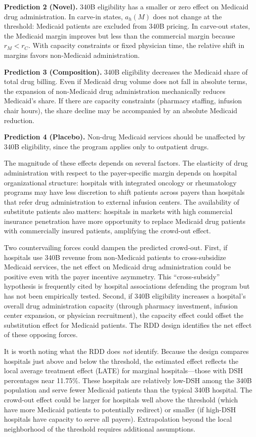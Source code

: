 \documentclass[12pt]{article}
\begin{document}
\textbf{Prediction 2 (Novel).} 340B eligibility has a smaller or zero effect on Medicaid drug administration. In carve-in states, $a_h(M)$ does not change at the threshold: Medicaid patients are excluded from 340B pricing. In carve-out states, the Medicaid margin improves but less than the commercial margin because $r_M < r_C$. With capacity constraints or fixed physician time, the relative shift in margins favors non-Medicaid administration.

\textbf{Prediction 3 (Composition).} 340B eligibility decreases the Medicaid share of total drug billing. Even if Medicaid drug volume does not fall in absolute terms, the expansion of non-Medicaid drug administration mechanically reduces Medicaid's share. If there are capacity constraints (pharmacy staffing, infusion chair hours), the share decline may be accompanied by an absolute Medicaid reduction.

\textbf{Prediction 4 (Placebo).} Non-drug Medicaid services should be unaffected by 340B eligibility, since the program applies only to outpatient drugs.

The magnitude of these effects depends on several factors. The elasticity of drug administration with respect to the payer-specific margin depends on hospital organizational structure: hospitals with integrated oncology or rheumatology programs may have less discretion to shift patients across payers than hospitals that refer drug administration to external infusion centers. The availability of substitute patients also matters: hospitals in markets with high commercial insurance penetration have more opportunity to replace Medicaid drug patients with commercially insured patients, amplifying the crowd-out effect.

Two countervailing forces could dampen the predicted crowd-out. First, if hospitals use 340B revenue from non-Medicaid patients to cross-subsidize Medicaid services, the net effect on Medicaid drug administration could be positive even with the payer incentive asymmetry. This ``cross-subsidy'' hypothesis is frequently cited by hospital associations defending the program but has not been empirically tested. Second, if 340B eligibility increases a hospital's overall drug administration capacity (through pharmacy investment, infusion center expansion, or physician recruitment), the capacity effect could offset the substitution effect for Medicaid patients. The RDD design identifies the net effect of these opposing forces.

It is worth noting what the RDD does \textit{not} identify. Because the design compares hospitals just above and below the threshold, the estimated effect reflects the local average treatment effect (LATE) for marginal hospitals---those with DSH percentages near 11.75\%. These hospitals are relatively low-DSH among the 340B population and serve fewer Medicaid patients than the typical 340B hospital. The crowd-out effect could be larger for hospitals well above the threshold (which have more Medicaid patients to potentially redirect) or smaller (if high-DSH hospitals have capacity to serve all payers). Extrapolation beyond the local neighborhood of the threshold requires additional assumptions.
\end{document}
